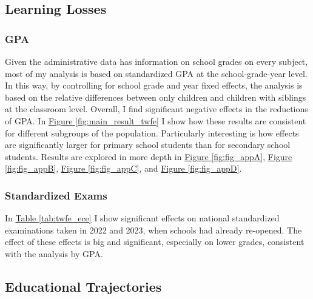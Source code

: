 \subsection{Learning Losses}


\subsubsection{GPA}

Given the administrative data has information on school grades on every subject, most of my analysis is based on standardized GPA at the school-grade-year level. In this way, by controlling for school grade and year fixed effects, the analysis is based on the relative differences between only children and children with siblings at the classroom level. Overall, I find significant negative effects in the reductions of GPA.  In \hyperref[fig:main_result_twfe]{Figure \ref{fig:main_result_twfe}} I show how these results are consistent for different subgroups of the population. Particularly interesting is how effects are significantly larger for primary school students than for secondary school students. Results are explored in more depth in \hyperref[fig:fig_appA]{Figure \ref{fig:fig_appA}}, \hyperref[fig:fig_appB]{Figure \ref{fig:fig_appB}}, \hyperref[fig:fig_appC]{Figure \ref{fig:fig_appC}}, and \hyperref[fig:fig_appD]{Figure \ref{fig:fig_appD}}.

\subsubsection{Standardized Exams}

In \hyperref[tab:twfe_ece]{Table \ref{tab:twfe_ece}}
I show significant effects on national standardized examinations taken in 2022 and 2023, when schools had already re-opened. The effect of these effects is big and significant, especially on lower grades, consistent with the analysis by GPA.

\subsection{Educational Trajectories}


